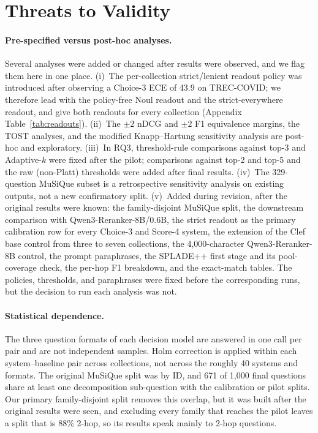 \section{Threats to Validity}

\paragraph{Pre-specified versus post-hoc analyses.}
Several analyses were added or changed after results were observed, and we flag them here in one place. (i)~The per-collection strict/lenient readout policy was introduced after observing a Choice-3 ECE of 43.9 on TREC-COVID; we therefore lead with the policy-free Noul readout and the strict-everywhere readout, and give both readouts for every collection (Appendix Table~\ref{tab:readouts}). (ii)~The $\pm2$ nDCG and $\pm2$ F1 equivalence margins, the TOST analyses, and the modified Knapp--Hartung sensitivity analysis are post-hoc and exploratory. (iii)~In RQ3, threshold-rule comparisons against top-3 and Adaptive-$k$ were fixed after the pilot; comparisons against top-2 and top-5 and the raw (non-Platt) thresholds were added after final results. (iv)~The 329-question MuSiQue subset is a retrospective sensitivity analysis on existing outputs, not a new confirmatory split. (v)~Added during revision, after the original results were known: the family-disjoint MuSiQue split, the downstream comparison with Qwen3-Reranker-8B/0.6B, the strict readout as the primary calibration row for every Choice-3 and Score-4 system, the extension of the Clef base control from three to seven collections, the 4{,}000-character Qwen3-Reranker-8B control, the prompt paraphrases, the SPLADE++ first stage and its pool-coverage check, the per-hop F1 breakdown, and the exact-match tables. The policies, thresholds, and paraphrases were fixed before the corresponding runs, but the decision to run each analysis was not.

\paragraph{Statistical dependence.}
The three question formats of each decision model are answered in one call per pair and are not independent samples. Holm correction is applied within each system--baseline pair across collections, not across the roughly 40 systems and formats. The original MuSiQue split was by ID, and 671 of 1{,}000 final questions share at least one decomposition sub-question with the calibration or pilot splits. Our primary family-disjoint split removes this overlap, but it was built after the original results were seen, and excluding every family that reaches the pilot leaves a split that is 88\% 2-hop, so its results speak mainly to 2-hop questions.

